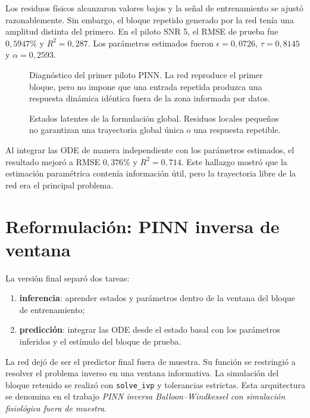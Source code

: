 Los residuos físicos alcanzaron valores bajos y la señal de entrenamiento se ajustó razonablemente. Sin embargo, el bloque repetido generado por la red tenía una amplitud distinta del primero. En el piloto SNR 5, el RMSE de prueba fue $0{,}5947\%$ y $R^2=0{,}287$. Los parámetros estimados fueron $\epsilon=0{,}0726$, $\tau=0{,}8145$ y $\alpha=0{,}2593$.

\begin{figure}[H]
\centering
{}
\caption{Diagnóstico del primer piloto PINN. La red reproduce el primer bloque, pero no impone que una entrada repetida produzca una respuesta dinámica idéntica fuera de la zona informada por datos.}
\label{fig:pinn_failure}
\end{figure}

\begin{figure}[H]
\centering
{}
\caption{Estados latentes de la formulación global. Residuos locales pequeños no garantizan una trayectoria global única o una respuesta repetible.}
\label{fig:pinn_failure_states}
\end{figure}

Al integrar las ODE de manera independiente con los parámetros estimados, el resultado mejoró a RMSE $0{,}376\%$ y $R^2=0{,}714$. Este hallazgo mostró que la estimación paramétrica contenía información útil, pero la trayectoria libre de la red era el principal problema.

\section{Reformulación: PINN inversa de ventana}
La versión final separó dos tareas:
\begin{enumerate}
  \item \textbf{inferencia}: aprender estados y parámetros dentro de la ventana del bloque de entrenamiento;
  \item \textbf{predicción}: integrar las ODE desde el estado basal con los parámetros inferidos y el estímulo del bloque de prueba.
\end{enumerate}

La red dejó de ser el predictor final fuera de muestra. Su función se restringió a resolver el problema inverso en una ventana informativa. La simulación del bloque retenido se realizó con \texttt{solve\_ivp} y tolerancias estrictas. Esta arquitectura se denomina en el trabajo \emph{PINN inversa Balloon--Windkessel con simulación fisiológica fuera de muestra}.

